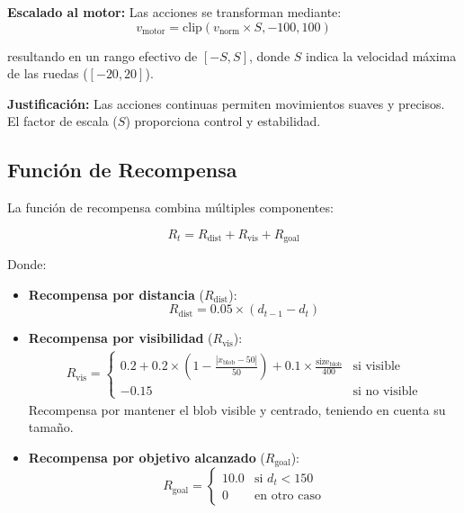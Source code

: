 \documentclass[12pt,a4paper]{article}
\begin{document}
\textbf{Escalado al motor:} Las acciones se transforman mediante:
\begin{equation}
v_{\text{motor}} = \text{clip}(v_{\text{norm}} \times S, -100, 100)
\end{equation}

resultando en un rango efectivo de $[-S, S]$, donde $S$ indica la velocidad máxima de las ruedas ($[-20, 20]$). 

\textbf{Justificación:} Las acciones continuas permiten movimientos suaves y precisos. El factor de escala ($S$) proporciona control y estabilidad.


\subsection{Función de Recompensa}

La función de recompensa combina múltiples componentes:

\begin{equation}
R_t = R_{\text{dist}} + R_{\text{vis}} + R_{\text{goal}}
\end{equation}

Donde:

\begin{itemize}
    \item \textbf{Recompensa por distancia} ($R_{\text{dist}}$):
    \begin{equation}
    R_{\text{dist}} = 0.05 \times (d_{t-1} - d_t)
    \end{equation}
    
    \item \textbf{Recompensa por visibilidad} ($R_{\text{vis}}$):
    \begin{align}
    R_{\text{vis}} = \begin{cases}
    0.2 + 0.2 \times (1 - \frac{|x_{\text{blob}} - 50|}{50}) + 0.1 \times \frac{\text{size}_{\text{blob}}}{400} & \text{si visible} \\
    -0.15 & \text{si no visible}
    \end{cases}
    \end{align}
    Recompensa por mantener el blob visible y centrado, teniendo en cuenta su tamaño.
    
    \item \textbf{Recompensa por objetivo alcanzado} ($R_{\text{goal}}$):
    \begin{equation}
    R_{\text{goal}} = \begin{cases}
    10.0 & \text{si } d_t < 150 \\
    0 & \text{en otro caso}
    \end{cases}
    \end{equation}
\end{itemize}
\end{document}
